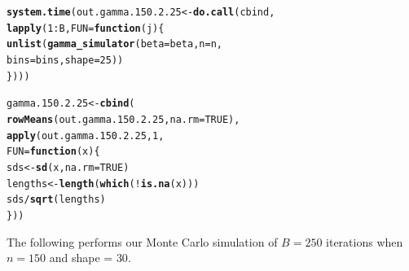 \documentclass[11pt]{article}\usepackage[]{graphicx}\usepackage[]{color}
\makeatletter
\newcommand{\hlnum}[1]{\textcolor[rgb]{0.686,0.059,0.569}{#1}}%
\newcommand{\hlopt}[1]{\textcolor[rgb]{0,0,0}{#1}}%
\newcommand{\hlstd}[1]{\textcolor[rgb]{0.345,0.345,0.345}{#1}}%
\newcommand{\hlkwa}[1]{\textcolor[rgb]{0.161,0.373,0.58}{\textbf{#1}}}%
\newcommand{\hlkwb}[1]{\textcolor[rgb]{0.69,0.353,0.396}{#1}}%
\newcommand{\hlkwc}[1]{\textcolor[rgb]{0.333,0.667,0.333}{#1}}%
\newcommand{\hlkwd}[1]{\textcolor[rgb]{0.737,0.353,0.396}{\textbf{#1}}}%
\newenvironment{kframe}{%
 \def\at@end@of@kframe{}%
 \ifinner\ifhmode%
  \def\at@end@of@kframe{\end{minipage}}%
  \begin{minipage}{\columnwidth}%
 \fi\fi%
 \def\FrameCommand##1{\hskip\@totalleftmargin \hskip-\fboxsep
 \colorbox{shadecolor}{##1}\hskip-\fboxsep
     \hskip-\linewidth \hskip-\@totalleftmargin \hskip\columnwidth}%
 \MakeFramed {\advance\hsize-\width
   \@totalleftmargin\z@ \linewidth\hsize
   \@setminipage}}%
 {\par\unskip\endMakeFramed%
 \at@end@of@kframe}
\newenvironment{knitrout}{}{} %
\makeatother
\begin{document}
\begin{knitrout}
\color{fgcolor}\begin{kframe}
\begin{alltt}
\hlkwd{system.time}\hlstd{(out.gamma.150.2.25} \hlkwb{<-} \hlkwd{do.call}\hlstd{(cbind,}
  \hlkwd{lapply}\hlstd{(}\hlnum{1}\hlopt{:}\hlstd{B,} \hlkwc{FUN} \hlstd{=} \hlkwa{function}\hlstd{(}\hlkwc{j}\hlstd{)\{}
    \hlkwd{unlist}\hlstd{(}\hlkwd{gamma_simulator}\hlstd{(}\hlkwc{beta} \hlstd{= beta,} \hlkwc{n} \hlstd{= n,}
      \hlkwc{bins} \hlstd{= bins,} \hlkwc{shape} \hlstd{=} \hlnum{25}\hlstd{))}
\hlstd{\})))}
\end{alltt}


{\ttfamily\noindent\bfseries\color{errorcolor}{\#\# Error in eval(family\$initialize): non-positive values not allowed for the 'gamma' family}}

{\ttfamily\noindent\itshape\color{messagecolor}{\#\# Timing stopped at: 0.003 0 0.002}}\end{kframe}
\end{knitrout}

\begin{knitrout}
\color{fgcolor}\begin{kframe}
\begin{alltt}
\hlstd{gamma.150.2.25} \hlkwb{<-} \hlkwd{cbind}\hlstd{(}
  \hlkwd{rowMeans}\hlstd{(out.gamma.150.2.25,} \hlkwc{na.rm} \hlstd{=} \hlnum{TRUE}\hlstd{),}
  \hlkwd{apply}\hlstd{(out.gamma.150.2.25,} \hlnum{1}\hlstd{,}
  \hlkwc{FUN} \hlstd{=} \hlkwa{function}\hlstd{(}\hlkwc{x}\hlstd{)\{}
    \hlstd{sds} \hlkwb{<-} \hlkwd{sd}\hlstd{(x,} \hlkwc{na.rm} \hlstd{=} \hlnum{TRUE}\hlstd{)}
    \hlstd{lengths} \hlkwb{<-} \hlkwd{length}\hlstd{(}\hlkwd{which}\hlstd{(}\hlopt{!}\hlkwd{is.na}\hlstd{(x)))}
    \hlstd{sds} \hlopt{/} \hlkwd{sqrt}\hlstd{(lengths)}
  \hlstd{\}))}
\end{alltt}


{\ttfamily\noindent\bfseries\color{errorcolor}{\#\# Error in is.data.frame(x): object 'out.gamma.150.2.25' not found}}\end{kframe}
\end{knitrout}

The following performs our Monte Carlo simulation of $B = 250$ iterations 
when $n = 150$ and shape = $30$.
\end{document}
